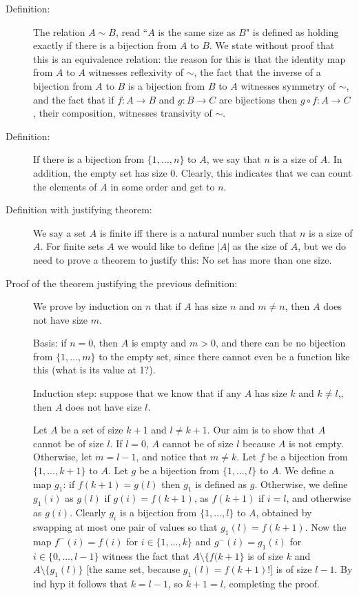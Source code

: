 \documentclass[12pt]{article}
\begin{document}
\begin{description}

\item[Definition:]  The relation $A \sim B$, read ``$A$ is the same size as $B$" is defined as holding exactly if there is a bijection from $A$ to $B$.  We state without proof that this is an equivalence relation:  the reason for this is that the identity map from $A$ to $A$ witnesses reflexivity of $\sim$, the fact that the inverse of a bijection from $A$ to $B$ is a bijection from $B$ to $A$ witnesses symmetry of $\sim$, and the fact that if $f:A \rightarrow B$ and $g:B \rightarrow C$ are bijections then $g \circ f:A \rightarrow C$, their composition, witnesses transivity of $\sim$.

\item[Definition:]  If there is a bijection from $\{1,\ldots,n\}$ to $A$, we say that $n$ is a size of $A$.  In addition, the empty set has size 0.  Clearly, this indicates that we can count the elements of $A$ in some order and get to $n$.

\item[Definition with justifying theorem:]  We say a set $A$ is finite iff there is a natural number such that $n$ is a size of $A$.  For finite sets $A$ we would like to define $|A|$ as the size of $A$, but we do need to prove a theorem to justify this:  No set has more than one size.

\item[Proof of the theorem justifying the previous definition:]  We prove by induction on $n$ that if $A$ has size $n$ and
$m \neq n$, then $A$ does not have size $m$.

Basis:  if $n=0$, then $A$ is empty and $m>0$, and there can be no bijection from $\{1,\ldots,m\}$ to the empty set, since there cannot even be a function like this (what is its value at 1?).

Induction step:  suppose that we know that if any $A$ has size $k$ and $k \neq l$,, then $A$ does not have size $l$.

Let $A$ be a set of size $k+1$ and $l \neq k+1$.  Our aim is to show that $A$ cannot be of size $l$.
If $l=0$, $A$ cannot be of size $l$ because $A$ is not empty.  Otherwise, let $m=l-1$, and notice that
$m \neq k$.  Let $f$ be a bijection from $\{1,\ldots,k+1\}$ to $A$.  Let $g$ be a bijection from $\{1,\ldots,l\}$ to $A$.
We define a map $g_1$:  if $f(k+1) = g(l)$ then $g_1$ is defined as $g$.
Otherwise, we define $g_1(i)$ as $g(l)$ if $g(i) = f(k+1)$, as $f(k+1)$ if $i=l$, and otherwise as $g(i)$.  Clearly $g_i$ is a bijection from $\{1,\ldots,l\}$ to $A$, obtained by swapping at most one pair of values so that $g_1(l)=f(k+1)$.
Now the map $f^-(i) = f(i)$ for $i \in \{1,\ldots,k\}$ and $g^-(i) = g_1(i)$ for $i \in \{0,\ldots,l-1\}$ witness the fact that $A \setminus \{f(k+1\}$ is of size $k$ and $A \setminus \{g_1(l)\}$ [the same set, because $g_1(l)=f(k+1)$!] is of size $l-1$.  By ind hyp it follows that $k=l-1$, so $k+1=l$, completing the proof.

\end{description}
\end{document}

